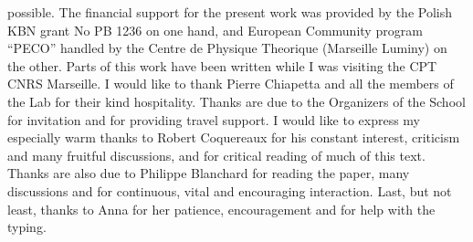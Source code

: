 \documentclass[12pt]{article}
\begin{document}
possible. The financial support for the present work 
was provided by the Polish KBN grant No PB 1236  on one hand, and
European Community program ``PECO'' handled by the Centre de Physique
Theorique (Marseille Luminy) on the other.  
Parts of this work have been written while
I was visiting the CPT CNRS Marseille.  I would like to thank Pierre
Chiapetta and all the members of the Lab  
for their kind hospitality.  
 Thanks are due to the Organizers of the School
for  invitation and for providing travel support.  I would like to 
express
my  especially warm thanks to Robert Coquereaux for his constant
interest,  criticism and many fruitful discussions, 
 and for critical reading of much of this text. Thanks are also due
to Philippe Blanchard for reading the paper, many discussions and
for continuous, vital and encouraging interaction. 
 Last,  but not least,  thanks to Anna for her patience, 
 encouragement and for help with
the typing. 

\medskip

\raggedright
\end{document}
